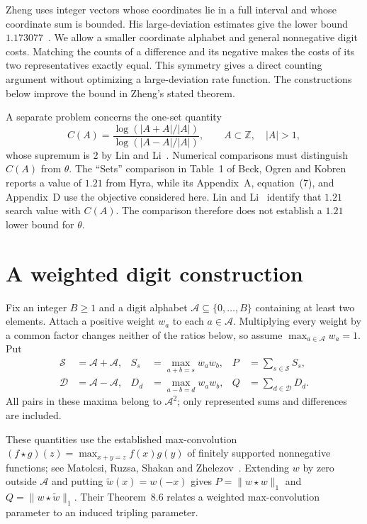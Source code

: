 \documentclass[11pt,a4paper]{article}
\newcommand{\Z}{\mathbb Z}
\newcommand{\A}{\mathcal A}
\newcommand{\D}{\mathcal D}
\newcommand{\Sset}{\mathcal S}
\begin{document}
Zheng uses integer vectors whose coordinates lie in a full interval and
whose coordinate sum is bounded. His large-deviation estimates give the
lower bound $1.173077$~\cite{zheng}. We allow a smaller coordinate alphabet
and general nonnegative digit costs. Matching the counts of a difference
and its negative makes the costs of its two representatives exactly equal.
This symmetry gives a direct counting argument without optimizing a
large-deviation rate function. The constructions below improve the bound
in Zheng's stated theorem.

A separate problem concerns the one-set quantity
\[
 C(A)=\frac{\log(|A+A|/|A|)}{\log(|A-A|/|A|)},
 \qquad A\subset\Z,\quad |A|>1,
\]
whose supremum is $2$ by Lin and Li~\cite{linli}. Numerical comparisons
must distinguish $C(A)$ from $\theta$. The ``Sets'' comparison in
Table~1 of Beck, Ogren and Kobren~\cite{hill} reports a value of $1.21$
from Hyra, while its Appendix~A, equation~(7), and Appendix~D use the
objective considered here. Lin and Li~\cite[Section~3]{linli} identify
that $1.21$ search value with $C(A)$. The comparison therefore does not
establish a $1.21$ lower bound for $\theta$.

\section{A weighted digit construction}
Fix an integer $B\ge1$ and a digit alphabet
$\A\subseteq\{0,\ldots,B\}$ containing at least two elements. Attach a
positive weight $w_a$ to each $a\in\A$. Multiplying every weight by a
common factor changes neither of the ratios below, so assume
$\max_{a\in\A}w_a=1$. Put
\begin{align}
 \Sset&=\A+\A, &
 S_s&=\max_{a+b=s} w_aw_b, &
 P&=\sum_{s\in\Sset}S_s,\label{eq:sums}\\
 \D&=\A-\A, &
 D_d&=\max_{a-b=d} w_aw_b, &
 Q&=\sum_{d\in\D}D_d.\label{eq:differences}
\end{align}
All pairs in these maxima belong to $\A^2$; only represented sums and
differences are included.

These quantities use the established max-convolution
$(f\star g)(z)=\max_{x+y=z}f(x)g(y)$ of finitely supported nonnegative
functions; see Matolcsi, Ruzsa, Shakan and
Zhelezov~\cite[Definition~8.1]{mrsz}. Extending $w$ by zero outside $\A$
and putting $\widetilde w(x)=w(-x)$ gives
$P=\|w\star w\|_1$ and $Q=\|w\star\widetilde w\|_1$.
Their Theorem~8.6 relates a weighted max-convolution parameter to an
induced tripling parameter.
\end{document}
